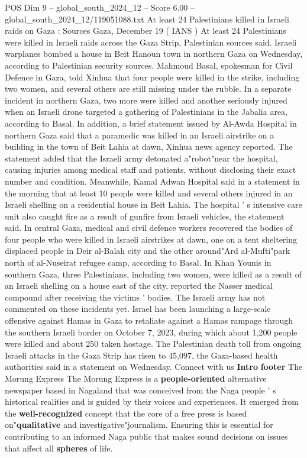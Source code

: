 \begin{textsample}{POS Dim 9 – global\_south\_2024\_12 – Score 6.00 – global\_south\_2024\_12/119051088.txt}  \label{ex:f9_pos_325}
At least 24 Palestinians killed in Israeli raids on Gaza : Sources Gaza, December 19 ( IANS ) At least 24 Palestinians were killed in Israeli raids across the Gaza Strip, Palestinian sources said.
Israeli warplanes bombed a house in Beit Hanoun town in northern Gaza on Wednesday, according to Palestinian security sources.
Mahmoud Basal, spokesman for Civil Defence in Gaza, told Xinhua that four people were killed in the strike, including two women, and several others are still missing under the rubble.
In a separate incident in northern Gaza, two more were killed and another seriously injured when an Israeli drone targeted a gathering of Palestinians in the Jabalia area, according to Basal.
In addition, a brief statement issued by Al-Awda Hospital in northern Gaza said that a paramedic was killed in an Israeli airstrike on a building in the town of Beit Lahia at dawn, Xinhua news agency reported.
The statement added that the Israeli army detonated a"robot"near the hospital, causing injuries among medical staff and patients, without disclosing their exact number and condition.
Meanwhile, Kamal Adwan Hospital said in a statement in the morning that at least 10 people were killed and several others injured in an Israeli shelling on a residential house in Beit Lahia.
The hospital ' s intensive care unit also caught fire as a result of gunfire from Israeli vehicles, the statement said.
In central Gaza, medical and civil defence workers recovered the bodies of four people who were killed in Israeli airstrikes at dawn, one on a tent sheltering displaced people in Deir al-Balah city and the other around"Ard al-Mufti"park north of al-Nuseirat refugee camp, according to Basal.
In Khan Younis in southern Gaza, three Palestinians, including two women, were killed as a result of an Israeli shelling on a house east of the city, reported the Nasser medical compound after receiving the victims ' bodies.
The Israeli army has not commented on these incidents yet.
Israel has been launching a large-scale offensive against Hamas in Gaza to retaliate against a Hamas rampage through the southern Israeli border on October 7, 2023, during which about 1,200 people were killed and about 250 taken hostage.
The Palestinian death toll from ongoing Israeli attacks in the Gaza Strip has risen to 45,097, the Gaza-based health authorities said in a statement on Wednesday.
Connect with us \textbf{Intro} \textbf{footer} The Morung Express The Morung Express is a \textbf{people-oriented} alternative newspaper based in Nagaland that was conceived from the Naga people ' s historical realities and is guided by their voices and experiences.
It emerged from the \textbf{well-recognized} concept that the core of a free press is based on"\textbf{qualitative} and investigative"journalism.
Ensuring this is essential for contributing to an informed Naga public that makes sound decisions on issues that affect all \textbf{spheres} of life.

\end{textsample}
